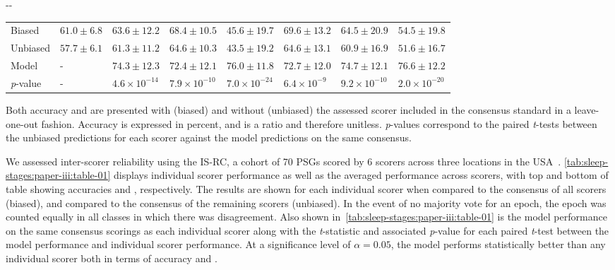 \begin{table}
\begin{adjustwidth*}{}{-\marginparwidth-\marginparsep}
\begin{threeparttable}
\begin{tabular}{@{}llllllll@{}}
        \quad Biased                       & $61.0\pm6.8$ & $63.6\pm12.2$          & $68.4\pm10.5$          & $45.6\pm19.7$           & $69.6\pm13.2$         & $64.5\pm20.9$          & $54.5\pm19.8$           \\
        \quad Unbiased                     & $57.7\pm6.1$ & $61.3\pm11.2$          & $64.6\pm10.3$          & $43.5\pm19.2$           & $64.6\pm13.1$         & $60.9\pm16.9$          & $51.6\pm16.7$           \\
        \quad Model                        & -            & $74.3\pm12.3$          & $72.4\pm12.1$          & $76.0\pm11.8$           & $72.7\pm12.0$         & $74.7\pm12.1$          & $76.6\pm12.2$           \\
        \textit{p}-value & -            & $4.6\times10^{-14}$ & $7.9\times10^{-10}$ & $7.0\times10^{-24}$ & $6.4\times10^{-9}$ & $9.2\times10^{-10}$ & $2.0\times10^{-20}$ \\ \bottomrule
    \end{tabular}
    \begin{tablenotes}
    \small \item Both accuracy and \cohen are presented with (biased) and without (unbiased) the assessed scorer included in the consensus standard in a leave-one-out fashion. Accuracy is expressed in percent, and \cohen is a ratio and therefore unitless. \textit{p}-values correspond to the paired \textit{t}-tests between the unbiased predictions for each scorer against the model predictions on the same consensus.
    \end{tablenotes}
\end{threeparttable}
\end{adjustwidth*}
\end{table}

We assessed inter-scorer reliability using the \ac{IS-RC}, a cohort of 70 \acp{PSG} scored by 6 scorers across three locations in the USA~\cite{Kuna2013}.
\cref{tab:sleep-stages:paper-iii:table-01} displays individual scorer performance as well as the averaged performance across scorers, with top and bottom of table showing accuracies and \cohen, respectively.
The results are shown for each individual scorer when compared to the consensus of all scorers (biased), and compared to the consensus of the remaining scorers (unbiased).
In the event of no majority vote for an epoch, the epoch was counted equally in all classes in which there was disagreement.
Also shown in~\cref{tab:sleep-stages:paper-iii:table-01} is the model performance on the same consensus scorings as each individual scorer along with the \textit{t}-statistic and associated \textit{p}-value for each paired \textit{t}-test between the model performance and individual scorer performance. 
At a significance level of \(\alpha=0.05\), the model performs statistically better than any individual scorer both in terms of accuracy and \cohen.

